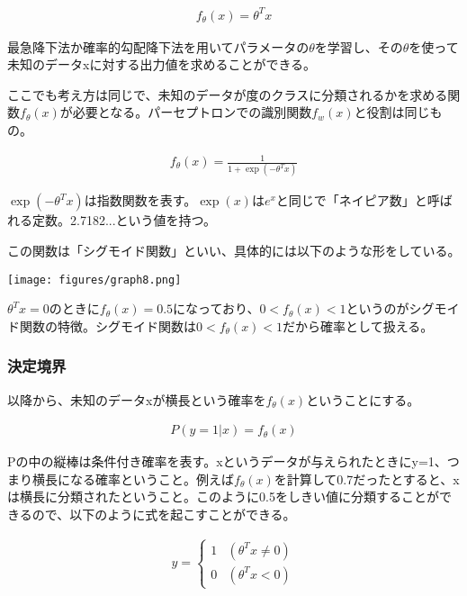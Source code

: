 \documentclass{jsarticle}
\begin{document}
\begin{align}
	f_{\theta}(x) = \theta^{T}x
\end{align}

最急降下法か確率的勾配降下法を用いてパラメータの$\theta$を学習し、その$\theta$を使って未知のデータxに対する出力値を求めることができる。

ここでも考え方は同じで、未知のデータが度のクラスに分類されるかを求める関数$f_{\theta}(x)$が必要となる。パーセプトロンでの識別関数$f_w(x)$と役割は同じもの。

\begin{align}
	f_{\theta}(x) = \frac{1}{1+\exp(-\theta^{T}x)}
\end{align}

$\exp(-\theta^{T}x)$は指数関数を表す。$\exp(x)はe^x$と同じで「ネイピア数」と呼ばれる定数。2.7182...という値を持つ。

この関数は「シグモイド関数」といい、具体的には以下のような形をしている。

\begin{center}
  \texttt{[image: figures/graph8.png]}
\end{center}

$\theta^{T}x=0のときにf_{\theta}(x)=0.5$になっており、$0 < f_{\theta}(x) < 1$というのがシグモイド関数の特徴。シグモイド関数は$0 < f_{\theta}(x) < 1$だから確率として扱える。

\subsubsection{決定境界}
以降から、未知のデータxが横長という確率を$f_{\theta}(x)$ということにする。

\begin{align}
	P(y=1|x) = f_{\theta}(x)
\end{align}

Pの中の縦棒は条件付き確率を表す。xというデータが与えられたときにy=1、つまり横長になる確率ということ。例えば$f_\theta(x)$を計算して0.7だったとすると、xは横長に分類されたということ。このように0.5をしきい値に分類することができるので、以下のように式を起こすことができる。

\begin{align}
	y = \left \{
    	\begin{array}{cc}
        1 & (\theta^{T}x \neq 0)\\
        0 & (\theta^{T}x < 0)
        \end{array}
    \right. \\
\end{align}
\end{document}
